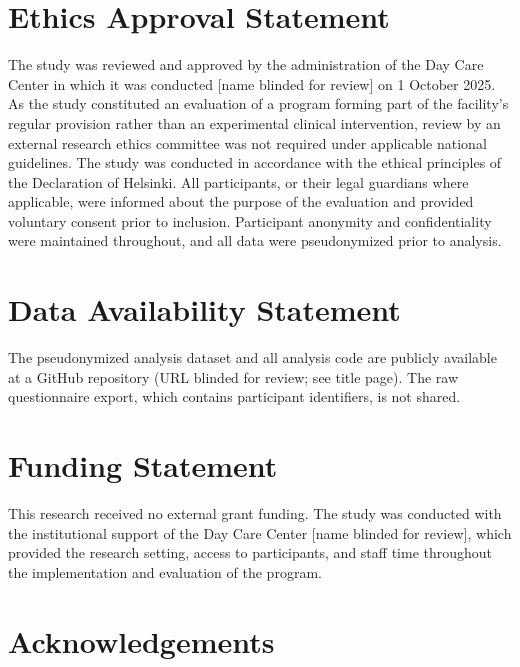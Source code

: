 \documentclass[12pt,a4paper]{article}
\begin{document}
\section*{Ethics Approval Statement}
The study was reviewed and approved by the administration of the Day Care Center in which it was conducted [name blinded for review] on 1 October 2025. As the study constituted an evaluation of a program forming part of the facility's regular provision rather than an experimental clinical intervention, review by an external research ethics committee was not required under applicable national guidelines. The study was conducted in accordance with the ethical principles of the Declaration of Helsinki. All participants, or their legal guardians where applicable, were informed about the purpose of the evaluation and provided voluntary consent prior to inclusion. Participant anonymity and confidentiality were maintained throughout, and all data were pseudonymized prior to analysis.

\section*{Data Availability Statement}
The pseudonymized analysis dataset and all analysis code are publicly available at a GitHub repository (URL blinded for review; see title page). The raw questionnaire export, which contains participant identifiers, is not shared.

\section*{Funding Statement}
This research received no external grant funding. The study was conducted with
the institutional support of the Day Care Center [name blinded for review],
which provided the research setting, access to participants, and staff time
throughout the implementation and evaluation of the program.

\section*{Acknowledgements}

\printbibliography
\end{document}
